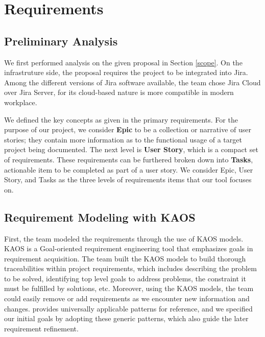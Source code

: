 \section{Requirements}
\label{requirement}

\subsection{Preliminary Analysis}
We first performed analysis on the given proposal in Section \ref{scope}. On the infrastruture side, the proposal requires the project to be integrated into Jira. Among the different versions of Jira software available, the team chose Jira Cloud over Jira Server, for its cloud-based nature is more compatible in modern workplace. 

We defined the key concepts as given in the primary requirements. For the purpose of our project, we consider
\textbf{Epic} to be a collection or narrative of user stories; they contain more information as to the functional usage of a target project being documented. The next level is \textbf{User Story}, which is a compact set of requirements. These requirements can be furthered broken down into \textbf{Tasks}, actionable item to be completed as part of a user story. 
We consider Epic, User Story, and Tasks as the three levels of requirements items that our tool focuses on. 

\subsection{Requirement Modeling with KAOS}
First, the team modeled the requirements through the use of KAOS models\cite{KAOS}. KAOS is a Goal-oriented requirement engineering \cite{GOAL} tool that emphasizes goals in requirement acquisition. The team built the KAOS models to build thorough traceabilities within project requirements, which includes describing the problem to be solved, identifying top level goals to address problems, the constraint it must be fulfilled by solutions, etc. Moreover, using the KAOS models, the team could easily remove or add requirements as we encounter new information and changes. \cite{KAOS} provides universally applicable patterns for reference, and we specified our initial goals by adopting these generic patterns, which also guide the later requirement refinement.

